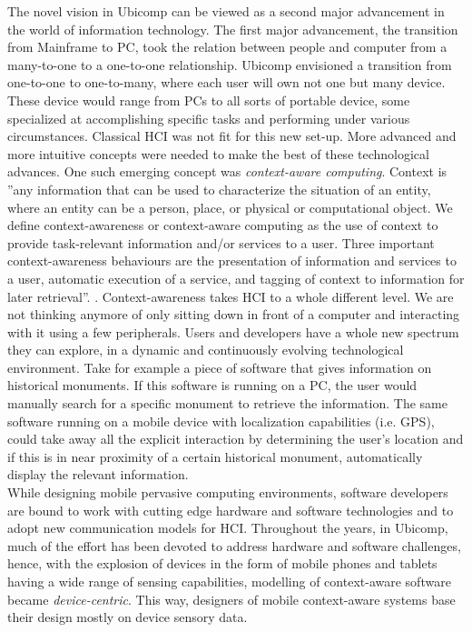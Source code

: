 The novel vision in Ubicomp can be viewed as a second major advancement in the world of information technology. The first major advancement, the transition from Mainframe to PC, took the relation between people and computer from a many-to-one to a one-to-one relationship. Ubicomp envisioned a transition from one-to-one to one-to-many, where each user will own not one but many device. These device would range from PCs to all sorts of portable device, some specialized at accomplishing specific tasks and performing under various circumstances. Classical HCI was not fit for this new set-up. More advanced and more intuitive concepts were needed to make the best of these technological advances. One such emerging concept was \emph{context-aware computing}. Context is ''any information that can be used to characterize the situation of an entity, where an entity can be a person, place, or physical or computational object. We define context-awareness or context-aware computing as the use of context to provide task-relevant information and/or services to a user. Three important context-awareness behaviours are the presentation of information and services to a user, automatic execution of a service, and tagging of context to information for later retrieval''. \cite{abowd1999towards}. Context-awareness takes HCI to a whole different level. We are not thinking anymore of only sitting down in front of a computer and interacting with it using a few peripherals. Users and developers have a whole new spectrum they can explore, in a dynamic and continuously evolving technological environment. Take for example a piece of software that gives information on historical monuments. If this software is running on a PC, the user would manually search for a specific monument to retrieve the information. The same software running on a mobile device with localization capabilities (i.e. GPS), could take away all the explicit interaction by determining the user's location and if this is in near proximity of a certain historical monument, automatically display the relevant information.\\

While designing mobile pervasive computing environments, software developers are bound to work with cutting edge hardware and software technologies and to adopt new communication models for HCI. Throughout the years, in Ubicomp, much of the effort has been devoted to address hardware and software challenges, hence, with the explosion of devices in the form of mobile phones and tablets having a wide range of sensing capabilities, modelling of context-aware software became \emph{device-centric}. This way, designers of mobile context-aware systems base their design mostly on device sensory data.\\

